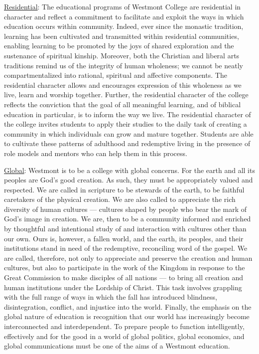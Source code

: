 \documentclass[letterpaper, 11pt]{article}
\begin{document}
			\underline{Residential}:  The educational programs of Westmont College are residential in character and reflect a commitment to facilitate and exploit the ways in which education occurs within community.  Indeed, ever since the monastic tradition, learning has been cultivated and transmitted within residential communities, enabling learning to be promoted by the joys of shared exploration and the sustenance of spiritual kinship.  Moreover, both the Christian and liberal arts traditions remind us of the integrity of human wholeness; we cannot be neatly compartmentalized into rational, spiritual and affective components.  The residential character allows and encourages expression of this wholeness as we live, learn and worship together.  Further, the residential character of the college reflects the conviction that the goal of all meaningful learning, and of biblical education in particular, is to inform the way we live.  The residential character of the college invites students to apply their studies to the daily task of creating a community in which individuals can grow and mature together.  Students are able to cultivate these patterns of adulthood and redemptive living in the presence of role models and mentors who can help them in this process.

			\underline{Global}:  Westmont is to be a college with global concerns.  For the earth and all its peoples are God's good creation.  As such, they must be appropriately valued and respected.  We are called in scripture to be stewards of the earth, to be faithful caretakers of the physical creation.  We are also called to appreciate the rich diversity of human cultures --- cultures shaped by people who bear the mark of God's image in creation.  We are, then to be a community informed and enriched by thoughtful and intentional study of and interaction with cultures other than our own.  Ours is, however, a fallen world, and the earth, its peoples, and their institutions stand in need of the redemptive, reconciling word of the gospel.  We are called, therefore, not only to appreciate and preserve the creation and human cultures, but also to participate in the work of the Kingdom in response to the Great Commission to make disciples of all nations --- to bring all creation and human institutions under the Lordship of Christ.  This task involves grappling with the full range of ways in which the fall has introduced blindness, disintegration, conflict, and injustice into the world.  Finally, the emphasis on the global nature of education is recognition that our world has increasingly become interconnected and interdependent.  To prepare people to function intelligently, effectively and for the good in a world of global politics, global economics, and global communications must be one of the aims of a Westmont education.
\end{document}
